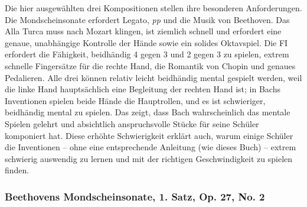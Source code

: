 Die hier ausgewählten drei Kompositionen stellen ihre besonderen Anforderungen.
Die Mondscheinsonate erfordert Legato, \textit{pp} und die Musik von Beethoven.
Das Alla Turca muss nach Mozart klingen, ist ziemlich schnell und erfordert eine genaue, unabhängige Kontrolle der Hände sowie ein solides Oktavspiel.
Die FI erfordert die Fähigkeit, beidhändig 4 gegen 3 und 2 gegen 3 zu spielen, extrem schnelle Fingersätze für die rechte Hand, die Romantik von Chopin und genaues Pedalieren.
Alle drei können relativ leicht beidhändig mental gespielt werden, weil die linke Hand hauptsächlich eine Begleitung der rechten Hand ist; in Bachs Inventionen spielen beide Hände die Hauptrollen, und es ist schwieriger, beidhändig mental zu spielen.
Das zeigt, dass Bach wahrscheinlich das mentale Spielen gelehrt und absichtlich anspruchsvolle Stücke für seine Schüler komponiert hat.
Diese erhöhte Schwierigkeit erklärt auch, warum einige Schüler die Inventionen -- ohne eine entsprechende Anleitung (wie dieses Buch) -- extrem schwierig auswendig zu lernen und mit der richtigen Geschwindigkeit zu spielen finden.


\subsubsection{Beethovens Mondscheinsonate, 1. Satz, Op. 27, No. 2}
\label{c1ii25b}


